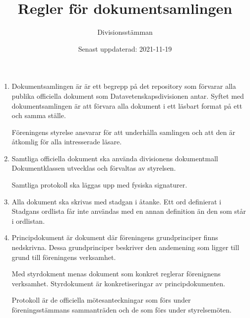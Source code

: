 \documentclass{dvd}
\begin{document}
	\title{Regler för dokumentsamlingen}
	\author{Divisionsstämman}
	\date{Senast uppdaterad: 2021-11-19}

	\begin{enumerate}[label=\arabic* §, ref=\arabic*]
		\item Dokumentsamlingen är är ett begrepp på det repository som förvarar alla publika officiella dokument som Datavetenskapsdivisionen antar.
		Syftet med dokumentsamlingen är att förvara alla dokument i ett läsbart format på ett och samma ställe.

		Föreningens styrelse ansvarar för att underhålla samlingen och att den är åtkomlig för alla intresserade läsare.
		
		\item Samtliga officiella dokument ska använda divisionens dokumentmall
		Dokumentklassen utvecklas och förvaltas av styrelsen.

		Samtliga protokoll ska läggas upp med fysiska signaturer.
		
		\item Alla dokument ska skrivas med stadgan i åtanke.
		Ett ord definierat i Stadgans ordlista får inte användas med en annan definition än den som står i ordlistan.

		\item Principdokument är dokument där föreningens grundprinciper finns nedskrivna.
		Dessa grundprinciper beskriver den andemening som ligger till grund till föreningens verksamhet.

		Med styrdokment menas dokument som konkret reglerar förenignens verksamhet.
		Styrdokument är konkretiseringar av principdokumenten.

		Protokoll är de officiella mötesanteckningar som förs under föreningsstämmans sammanträden och de som förs under styrelsemöten.
	\end{enumerate}
\end{document}
